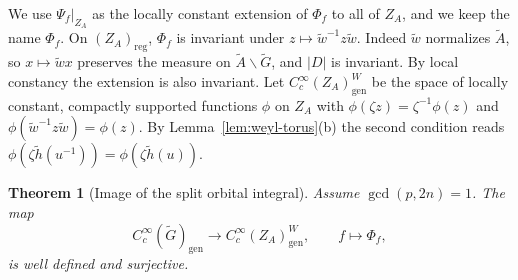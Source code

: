 \documentclass[12pt,letterpaper]{article}
\numberwithin{equation}{section}
\theoremstyle{plain}
\newtheorem{theorem}{Theorem}[section]
\theoremstyle{definition}
\theoremstyle{remark}
\newcommand{\Gt}{\widetilde G}
\newcommand{\At}{\widetilde A}
\newcommand{\hl}{\tilde h}
\newcommand{\wt}{\tilde w}
\newcommand{\ZA}{Z_A}
\newcommand{\gen}{\mathrm{gen}}
\newcommand{\reg}{\mathrm{reg}}
\begin{document}
We use $\Psi_f|_{\ZA}$ as the locally constant extension of $\Phi_f$
to all of $\ZA$, and we keep the name $\Phi_f$. On $(\ZA)_\reg$,
$\Phi_f$ is invariant under $z\mapsto\wt^{-1}z\wt$. Indeed $\wt$
normalizes $\At$, so $x\mapsto\wt x$ preserves the measure on
$\At\backslash\Gt$, and $|D|$ is invariant. By local constancy the
extension is also invariant. Let $C_c^\infty(\ZA)_\gen^W$ be the space
of locally constant, compactly supported functions $\phi$ on $\ZA$ with
$\phi(\zeta z)=\zeta^{-1}\phi(z)$ and $\phi(\wt^{-1}z\wt)=\phi(z)$. By
Lemma~\ref{lem:weyl-torus}(b) the second condition reads
$\phi(\zeta\hl(u^{-1}))=\phi(\zeta\hl(u))$.

\begin{theorem}[Image of the split orbital integral]\label{thm:orbital}
Assume $\gcd(p,2n)=1$. The map
\begin{equation}\label{eq:orb-surj}
C_c^\infty(\Gt)_\gen\longrightarrow C_c^\infty(\ZA)_\gen^W,\qquad
f\longmapsto\Phi_f,
\end{equation}
is well defined and surjective.
\end{theorem}
\end{document}
